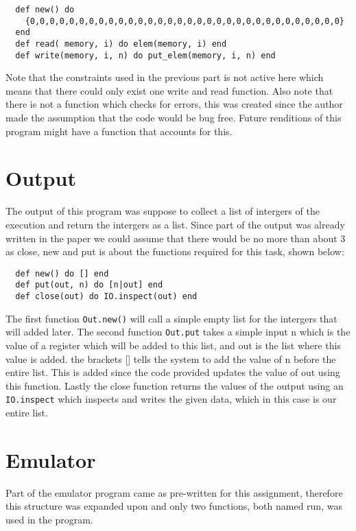 \documentclass[a4paper,11pt]{article}
\begin{document}
\begin{verbatim}
  def new() do
    {0,0,0,0,0,0,0,0,0,0,0,0,0,0,0,0,0,0,0,0,0,0,0,0,0,0,0,0,0,0,0,0}
  end
  def read( memory, i) do elem(memory, i) end  
  def write(memory, i, n) do put_elem(memory, i, n) end
\end{verbatim}

Note that the constraints used in the previous part is not active here which means that there could only exist one write and read function. Also note that there is not a function which checks for errors, this was created since the author made the assumption that the code would be bug free. Future renditions of this program might have a function that accounts for this.

\section*{Output}

The output of this program was suppose to collect a list of intergers of the execution and return the intergers as a list. Since part of the output was already written in the paper we could assume that there would be no more than about 3 as close, new and put is about the functions required for this task, shown below:

\begin{verbatim}
  def new() do [] end
  def put(out, n) do [n|out] end
  def close(out) do IO.inspect(out) end
\end{verbatim}

The first function {\tt Out.new()} will call a simple empty list for the intergers that will added later. 
The second function {\tt Out.put} takes a simple input n which is the value of a register which will be added to this list, and out is the list where this value is added. the brackets [] tells the system to add the value of n before the entire list. This is added since the code provided updates the value of out using this function. 
Lastly the close function returns the values of the output using an {\tt IO.inspect} which inspects and writes the given data, which in this case is our entire list.

\section*{Emulator}

Part of the emulator program came as pre-written for this assignment, therefore this structure was expanded upon and only two functions, both named run, was used in the program.
\end{document}

